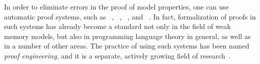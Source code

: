 In order to eliminate errors in the proof of model properties, one can use automatic proof systems, such as \coq~\autocite{Coq}, \agda~\autocite{Agda}, \lean~\autocite{Lean}, and \arend~\autocite{Arend}.
In fact, formalization of proofs in such systems has already become a standard not only in the field of weak memory models, but also in programming language theory in general, as well as in a number of other areas.
The practice of using such systems has been named \emph{proof engineering}, and it is a separate, actively growing field of research~\autocite{Ringer-al:FTPL19}.

